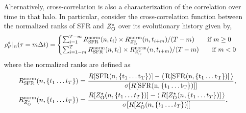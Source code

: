 Alternatively, cross-correlation is also a characterization of the correlation over time in that halo. In particular, consider the cross-correlation function between the normalized ranks of SFR and $Z^{\star}_{\rm{O}}$ over its evolutionary history given by, 
\begin{align}
\rho^s_{t'} |_{n}(\tau = m \Delta t) 
&= \begin{cases}
\sum_{i=1}^{T-m} R^{\rm{norm}}_{\rm{SFR}}(n,t_i) \times R^{\rm{norm}}_{Z^{\star}_{\rm{O}}}(n,t_{i+m})/(T-m) \qquad \text{if } m \geq 0 \\
\sum_{i=1-m}^{T} R^{\rm{norm}}_{\rm{SFR}}(n,t_i) \times R^{\rm{norm}}_{Z^{\star}_{\rm{O}}}(n,t_{i+m})/(T-m) \qquad \text{if } m < 0
\end{cases}
\end{align}
where the normalized ranks are defined as
\begin{align}
R^{\rm{norm}}_{\rm{SFR}}(n,\{t_1 \ldots t_T\}) &= \frac{R[\rm{SFR}(n,\{t_1 \ldots t_T\})] - \left\langle \,R[\rm{SFR}(n,\{t_1 \ldots t_T\})]\, \right\rangle}{\sigma[R[\rm{SFR}(n,\{t_1 \ldots t_T\})]]},\\
R^{\rm{norm}}_{Z^{\star}_{\rm{O}}}(n,\{t_1 \ldots t_T\}) &= \frac{R[Z^{\star}_{\rm{O}}(n,\{t_1 \ldots t_T\})] - \left\langle \,R[Z^{\star}_{\rm{O}}(n,\{t_1 \ldots t_T\})]\, \right\rangle}{\sigma[R[Z^{\star}_{\rm{O}}(n,\{t_1 \ldots t_T\})]]}.
\end{align}

